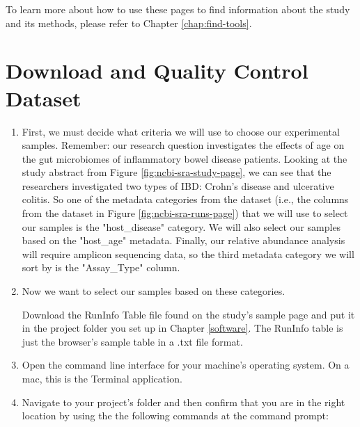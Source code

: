 To learn more about how to use these pages to find information about the study and its methods, please refer to Chapter \ref{chap:find-tools}. 
    
    \section{Download and Quality Control Dataset}
    
        \begin{enumerate}
            \item First, we must decide what criteria we will use to choose our experimental samples. 
            \newline
            Remember: our research question investigates the effects of age on the gut microbiomes of inflammatory bowel disease patients. Looking at the study abstract from Figure \ref{fig:ncbi-sra-study-page}, we can see that the researchers investigated two types of IBD: Crohn's disease and ulcerative colitis. So one of the metadata categories from the dataset (i.e., the columns from the dataset in Figure \ref{fig:ncbi-sra-runs-page}) that we will use to select our samples is the "host\_disease" category. We will also select our samples based on the "host\_age" metadata. Finally, our relative abundance analysis will require amplicon sequencing data, so the third metadata category we will sort by is the "Assay\_Type" column.
            
            \item Now we want to select our samples based on these categories. 
            
            Download the RunInfo Table file found on the study's sample page and put it in the project folder you set up in Chapter \ref{software}. The RunInfo table is just the browser's sample table in a .txt file format.
            
            \item Open the command line interface for your machine's operating system. On a mac, this is the Terminal application. 
            
            \item Navigate to your project's folder and then confirm that you are in the right location by using the the following commands at the command prompt:
            

\end{enumerate}
